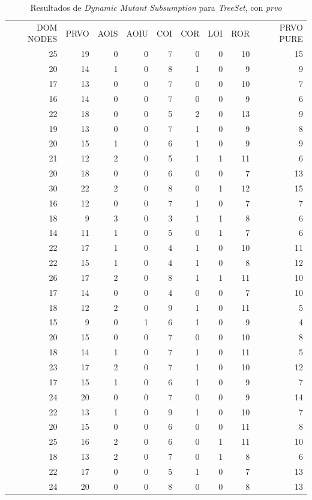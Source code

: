 \begin{table}[]
	\caption{Resultados de \emph{Dynamic Mutant Subsumption} para \emph{TreeSet}, con \emph{prvo}}
	\label{tables.results.subsumption.treeset.prvo}
	\centering
	\scriptsize
	\def\arraystretch{0.95}
	\setlength\tabcolsep{0.5mm}
	\begin{tabular}{rrrrrrrrr}
		DOM NODES & PRVO & AOIS & AOIU & COI & COR & LOI & ROR & PRVO PURE \\
		25 & 19 & 0 & 0 & 7 & 0 & 0 & 10 & 15 \\
		20 & 14 & 1 & 0 & 8 & 1 & 0 & 9 & 9 \\
		17 & 13 & 0 & 0 & 7 & 0 & 0 & 10 & 7 \\
		16 & 14 & 0 & 0 & 7 & 0 & 0 & 9 & 6 \\
		22 & 18 & 0 & 0 & 5 & 2 & 0 & 13 & 9 \\
		19 & 13 & 0 & 0 & 7 & 1 & 0 & 9 & 8 \\
		20 & 15 & 1 & 0 & 6 & 1 & 0 & 9 & 9 \\
		21 & 12 & 2 & 0 & 5 & 1 & 1 & 11 & 6 \\
		20 & 18 & 0 & 0 & 6 & 0 & 0 & 7 & 13 \\
		30 & 22 & 2 & 0 & 8 & 0 & 1 & 12 & 15 \\
		16 & 12 & 0 & 0 & 7 & 1 & 0 & 7 & 7 \\
		18 & 9 & 3 & 0 & 3 & 1 & 1 & 8 & 6 \\
		14 & 11 & 1 & 0 & 5 & 0 & 1 & 7 & 6 \\
		22 & 17 & 1 & 0 & 4 & 1 & 0 & 10 & 11 \\
		22 & 15 & 1 & 0 & 4 & 1 & 0 & 8 & 12 \\
		26 & 17 & 2 & 0 & 8 & 1 & 1 & 11 & 10 \\
		17 & 14 & 0 & 0 & 4 & 0 & 0 & 7 & 10 \\
		18 & 12 & 2 & 0 & 9 & 1 & 0 & 11 & 5 \\
		15 & 9 & 0 & 1 & 6 & 1 & 0 & 9 & 4 \\
		20 & 15 & 0 & 0 & 7 & 0 & 0 & 10 & 8 \\
		18 & 14 & 1 & 0 & 7 & 1 & 0 & 11 & 5 \\
		23 & 17 & 2 & 0 & 7 & 1 & 0 & 10 & 12 \\
		17 & 15 & 1 & 0 & 6 & 1 & 0 & 9 & 7 \\
		24 & 20 & 0 & 0 & 7 & 0 & 0 & 9 & 14 \\
		22 & 13 & 1 & 0 & 9 & 1 & 0 & 10 & 7 \\
		20 & 15 & 0 & 0 & 6 & 0 & 0 & 11 & 8 \\
		25 & 16 & 2 & 0 & 6 & 0 & 1 & 11 & 10 \\
		18 & 13 & 2 & 0 & 7 & 0 & 1 & 8 & 6 \\
		22 & 17 & 0 & 0 & 5 & 1 & 0 & 7 & 13 \\
		24 & 20 & 0 & 0 & 8 & 0 & 0 & 8 & 13
	\end{tabular}
\end{table}

